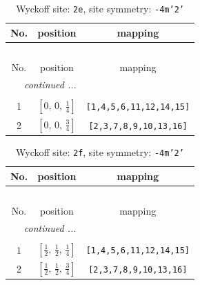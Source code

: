 \documentclass[fleqn,8pt]{jsarticle}
\begin{document}
\begin{longtable}{ccc}
\caption{Wyckoff site: {\tt 2e}, site symmetry: {\tt -4m'2'}}
 \\
 \hline \hline
No. & position & mapping \\ \hline \endfirsthead

\multicolumn{2}{l}{\tablename\ \thetable{}} \\
 \hline \hline
No. & position & mapping \\ \hline \endhead

 \hline \hline
\multicolumn{2}{r}{\footnotesize\it continued ...} \\ \endfoot

 \hline \hline
\multicolumn{2}{r}{} \\ \endlastfoot

1 & $\left[ 0,\, 0,\, \frac{1}{4} \right]$ & {\tt [1,4,5,6,11,12,14,15]} \\ \hline
2 & $\left[ 0,\, 0,\, \frac{3}{4} \right]$ & {\tt [2,3,7,8,9,10,13,16]} \\
\end{longtable}
\renewcommand{\arraystretch}{1.2}
\begin{longtable}{ccc}
\caption{Wyckoff site: {\tt 2f}, site symmetry: {\tt -4m'2'}}
 \\
 \hline \hline
No. & position & mapping \\ \hline \endfirsthead

\multicolumn{2}{l}{\tablename\ \thetable{}} \\
 \hline \hline
No. & position & mapping \\ \hline \endhead

 \hline \hline
\multicolumn{2}{r}{\footnotesize\it continued ...} \\ \endfoot

 \hline \hline
\multicolumn{2}{r}{} \\ \endlastfoot

1 & $\left[ \frac{1}{2},\, \frac{1}{2},\, \frac{1}{4} \right]$ & {\tt [1,4,5,6,11,12,14,15]} \\ \hline
2 & $\left[ \frac{1}{2},\, \frac{1}{2},\, \frac{3}{4} \right]$ & {\tt [2,3,7,8,9,10,13,16]} \\
\end{longtable}
\renewcommand{\arraystretch}{1.2}
\end{document}
